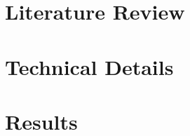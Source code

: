 \documentclass[10pt]{beamer}
\begin{document}










\section{Literature Review}
\section{Technical Details}
\section{Results}  
\end{document}
